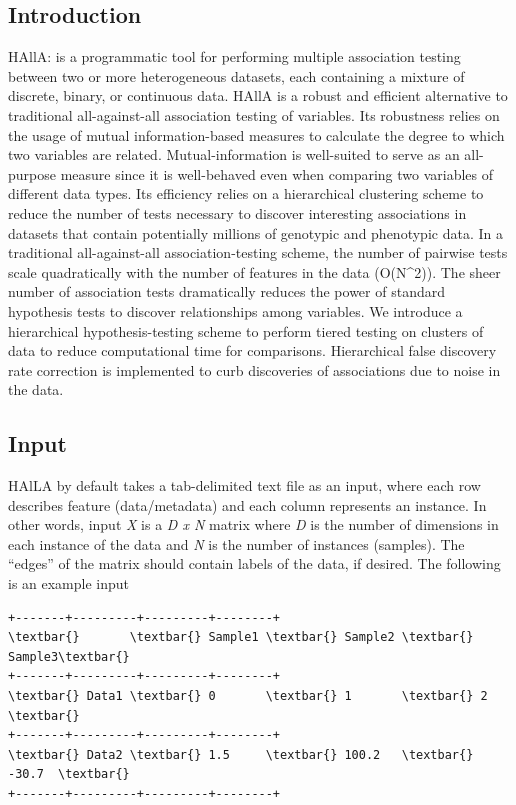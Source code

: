\documentclass[letterpaper,10pt,english]{sphinxmanual}
\begin{document}
\subsection{Introduction}
\label{index:introduction}
HAllA: is a programmatic tool for performing multiple association testing between two or more heterogeneous datasets, each containing a mixture of discrete, binary, or continuous data. HAllA is a robust and efficient alternative to traditional all-against-all association testing of variables. Its robustness relies on the usage of mutual information-based measures to calculate the degree to which two variables are related. Mutual-information is well-suited to serve as an all-purpose measure since it is well-behaved even when comparing two variables of different data types. Its efficiency relies on a hierarchical clustering scheme to reduce the number of tests necessary to discover interesting associations in datasets that contain potentially millions of genotypic and phenotypic data. In a traditional all-against-all association-testing scheme, the number of pairwise tests scale quadratically with the number of features in the data (O(N\textasciicircum{}2)). The sheer number of association tests dramatically reduces the power of standard hypothesis tests to discover relationships among variables. We introduce a hierarchical hypothesis-testing scheme to perform tiered testing on clusters of data to reduce computational time for comparisons. Hierarchical false discovery rate correction is implemented to curb discoveries of associations due to noise in the data.


\subsection{Input}
\label{index:input}
HAlLA by default takes a tab-delimited text file as an input, where each row describes feature (data/metadata) and each column represents an instance. In other words, input \emph{X} is a \emph{D x N} matrix where \emph{D} is the number of dimensions in each instance of the data and \emph{N} is the number of instances (samples). The ``edges'' of the matrix should contain labels of the data, if desired. The following is an example input

\begin{Verbatim}[commandchars=\\\{\}]
+-------+---------+---------+--------+
\textbar{}       \textbar{} Sample1 \textbar{} Sample2 \textbar{} Sample3\textbar{}
+-------+---------+---------+--------+
\textbar{} Data1 \textbar{} 0       \textbar{} 1       \textbar{} 2      \textbar{}
+-------+---------+---------+--------+
\textbar{} Data2 \textbar{} 1.5     \textbar{} 100.2   \textbar{} -30.7  \textbar{}
+-------+---------+---------+--------+
\end{Verbatim}
\end{document}
